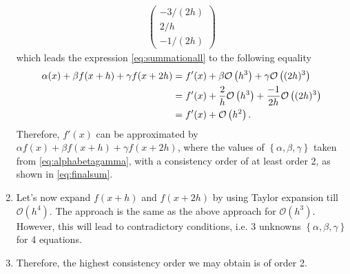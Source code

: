 \documentclass[12pt]{article}
\begin{document}
\begin{enumerate}
\begin{align}
\begin{pmatrix}
			      -3/(2h) \\ 2/h \\ -1/(2h)
		      \end{pmatrix}
	      \end{align}
	      which leads the expression \eqref{eq:summationall} to the following equality
	      \begin{align}
		      \label{eq:finalsum}
		      \alpha (x) + \beta f(x+h) + \gamma f(x+2h) 
		       & =
		      f'(x)
		      + \beta \mathcal{O}\left( h^3 \right) + \gamma \mathcal{O}\left( (2h)^3 \right) \notag \\
		       & = f'(x)
		      + \frac{2}{h} \mathcal{O}\left( h^3 \right)
		      + \frac{-1}{2h} \mathcal{O}\left( (2h)^3 \right)                                \notag \\
		       & = f'(x) + \mathcal{O}\left( h^2 \right).
	      \end{align}
	      Therefore, $f'(x)$ can be approximated by $\alpha f(x) + \beta f(x+h) + \gamma f(x+2h)$,
	      where the values of $\left\{ \alpha, \beta, \gamma \right\}$ taken from \eqref{eq:alphabetagamma}, 
	      with a consistency order of at least order 2, as shown in \eqref{eq:finalsum}.
	      
	\item Let's now expand $f(x+h)$ and $f(x+2h)$
	      by using Taylor expansion till $\mathcal{O}(h^4)$.
	      The approach is the same as the above approach  
	      for $\mathcal{O}(h^3)$.
	      However, this will lead to contradictory conditions,  
	      i.e. 3 unknowns $\left\{ \alpha, \beta, \gamma \right\}$  for 4 equations. 
	      
	\item Therefore, the highest consistency order we may obtain is of order 2.
\end{enumerate}
\end{document}
